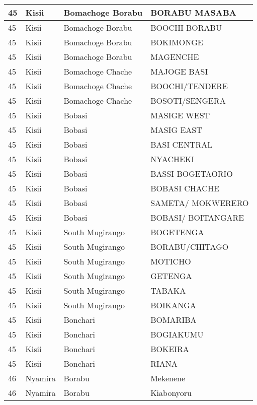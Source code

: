 \begin{table}[!ht]
\begin{tabular}{|l|l|l|l|}
        45 & Kisii & Bomachoge Borabu & BORABU MASABA \\ \hline
        45 & Kisii & Bomachoge Borabu & BOOCHI BORABU \\ \hline
        45 & Kisii & Bomachoge Borabu & BOKIMONGE \\ \hline
        45 & Kisii & Bomachoge Borabu & MAGENCHE \\ \hline
        45 & Kisii & Bomachoge Chache & MAJOGE BASI \\ \hline
        45 & Kisii & Bomachoge Chache & BOOCHI/TENDERE \\ \hline
        45 & Kisii & Bomachoge Chache & BOSOTI/SENGERA \\ \hline
        45 & Kisii & Bobasi & MASIGE WEST \\ \hline
        45 & Kisii & Bobasi & MASIG EAST \\ \hline
        45 & Kisii & Bobasi & BASI CENTRAL \\ \hline
        45 & Kisii & Bobasi & NYACHEKI \\ \hline
        45 & Kisii & Bobasi & BASSI BOGETAORIO \\ \hline
        45 & Kisii & Bobasi & BOBASI CHACHE \\ \hline
        45 & Kisii & Bobasi & SAMETA/ MOKWERERO \\ \hline
        45 & Kisii & Bobasi & BOBASI/ BOITANGARE \\ \hline
        45 & Kisii & South Mugirango & BOGETENGA \\ \hline
        45 & Kisii & South Mugirango & BORABU/CHITAGO \\ \hline
        45 & Kisii & South Mugirango & MOTICHO \\ \hline
        45 & Kisii & South Mugirango & GETENGA \\ \hline
        45 & Kisii & South Mugirango & TABAKA \\ \hline
        45 & Kisii & South Mugirango & BOIKANGA \\ \hline
        45 & Kisii & Bonchari & BOMARIBA \\ \hline
        45 & Kisii & Bonchari & BOGIAKUMU \\ \hline
        45 & Kisii & Bonchari & BOKEIRA \\ \hline
        45 & Kisii & Bonchari & RIANA \\ \hline
        46 & Nyamira & Borabu & Mekenene \\ \hline
        46 & Nyamira & Borabu & Kiabonyoru \\ \hline

\end{tabular}
\end{table}
